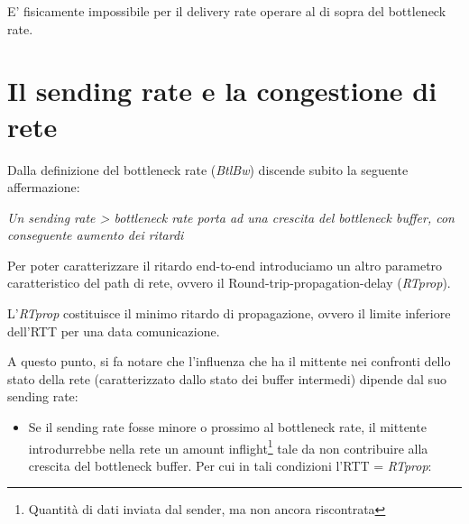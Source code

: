 E' fisicamente impossibile per il delivery rate operare al di sopra del bottleneck rate. 

\section{Il sending rate e la congestione di rete}

%
%
%

Dalla definizione del bottleneck rate (\textit{BtlBw}) discende subito la seguente affermazione:

\begin{center}
\label{sending_bottleneck_cons}
\textit{Un sending rate > bottleneck rate porta ad una crescita del bottleneck buffer, con conseguente aumento dei ritardi}
\end{center}

Per poter caratterizzare il ritardo end-to-end introduciamo un altro parametro caratteristico del path di rete, ovvero il Round-trip-propagation-delay (\textit{RTprop}). \bigskip

L'\textit{RTprop} costituisce il minimo ritardo di propagazione, ovvero il limite inferiore dell'RTT per una data comunicazione. \bigskip

A questo punto, si fa notare che l'influenza che ha il mittente nei confronti dello stato della rete (caratterizzato dallo stato dei buffer intermedi) dipende dal suo sending rate:

\begin{itemize}

\item Se il sending rate fosse minore o prossimo al bottleneck rate, il mittente introdurrebbe nella rete un amount inflight\footnote{Quantità di dati inviata dal sender, ma non ancora riscontrata} tale da non contribuire alla crescita del bottleneck buffer. Per cui in tali condizioni l'RTT = \textit{RTprop}:

\end{itemize}

